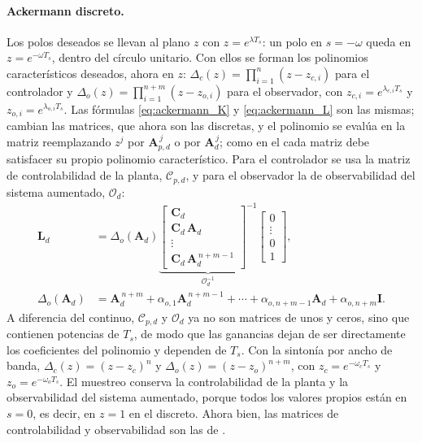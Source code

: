 \paragraph{Ackermann discreto.} Los polos deseados se llevan al plano $z$ con
$z = e^{\lambda T_s}$: un polo en $s = -\omega$ queda en $z = e^{-\omega T_s}$,
dentro del círculo unitario. Con ellos se forman los polinomios característicos
deseados, ahora en $z$: $\Delta_c(z) = \prod_{i=1}^{n} (z - z_{c,i})$ para el controlador y
$\Delta_o(z) = \prod_{i=1}^{n+m} (z - z_{o,i})$ para el observador, con
$z_{c,i} = e^{\lambda_{c,i} T_s}$ y $z_{o,i} = e^{\lambda_{o,i} T_s}$. Las fórmulas
\eqref{eq:ackermann_K} y \eqref{eq:ackermann_L} son las mismas;
cambian las matrices, que ahora son las discretas, y el polinomio se evalúa en
la matriz reemplazando $z^j$ por $\mathbf{A}_{p,d}^{\,j}$ o por $\mathbf{A}_d^{\,j}$; como en el
 cada matriz debe satisfacer su propio polinomio
característico. Para el controlador se usa la matriz de controlabilidad de la planta,
$\mathcal{C}_{p,d}$, y para el observador la de observabilidad del sistema aumentado,
$\mathcal{O}_d$:
\begin{equation}
\begin{aligned}
\mathbf{L}_d &= \Delta_o(\mathbf{A}_d)
\underbrace{\begin{bmatrix}
\mathbf{C}_d \\ \mathbf{C}_d\,\mathbf{A}_d \\ \vdots \\ \mathbf{C}_d\,\mathbf{A}_d^{\,n+m-1}
\end{bmatrix}^{-1}}_{\mathcal{O}_d^{-1}}
\begin{bmatrix} 0 \\ \vdots \\ 0 \\ 1 \end{bmatrix},
\\
\Delta_o(\mathbf{A}_d) &= \mathbf{A}_d^{\,n+m} + \alpha_{o,1}\mathbf{A}_d^{\,n+m-1} + \cdots + \alpha_{o,n+m-1}\mathbf{A}_d + \alpha_{o,n+m}\mathbf{I} .
\end{aligned}
\label{eq:disc_ackermann_L}
\end{equation}
A diferencia del continuo, $\mathcal{C}_{p,d}$ y $\mathcal{O}_d$ ya no son
matrices de unos y ceros, sino que contienen potencias de $T_s$, de modo que las
ganancias dejan de ser directamente los coeficientes del polinomio y dependen
de $T_s$. Con la sintonía por ancho de banda,
$\Delta_c(z) = (z - z_c)^{n}$ y $\Delta_o(z) = (z - z_o)^{n+m}$, con
$z_c = e^{-\omega_c T_s}$ y $z_o = e^{-\omega_o T_s}$.
El muestreo conserva la controlabilidad de la planta y la observabilidad del
sistema aumentado, porque todos los valores propios están en $s = 0$, es decir, en $z = 1$ en el discreto. Ahora bien, las matrices de controlabilidad y observabilidad
son las de \cite[sec.~12.6.1]{chen1993analog}.

